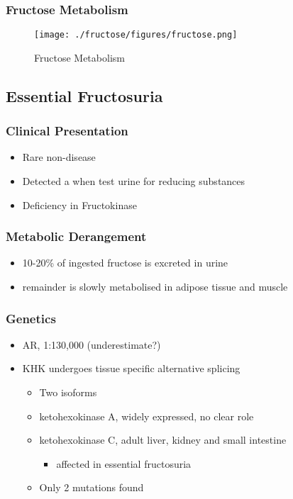 \documentclass{scrartcl}
\begin{document}
\subsubsection{Fructose Metabolism}
\label{sec:org4717860}
\begin{figure}[htbp]
\centering
\texttt{[image: ./fructose/figures/fructose.png]}
\caption[Fructose]{\label{fig:orgfacca5b}
Fructose Metabolism}
\end{figure}
\subsection{Essential Fructosuria}
\label{sec:orge437605}
\subsubsection{Clinical Presentation}
\label{sec:orge31ba7d}
\begin{itemize}
\item Rare non-disease
\item Detected a when test urine for reducing substances
\item Deficiency in Fructokinase
\end{itemize}
\subsubsection{Metabolic Derangement}
\label{sec:orgf5eeb87}
\begin{itemize}
\item 10-20\% of ingested fructose is excreted in urine
\item remainder is slowly metabolised in adipose tissue and muscle
\end{itemize}
\subsubsection{Genetics}
\label{sec:org37abae2}
\begin{itemize}
\item AR, 1:130,000 (underestimate?)
\item KHK undergoes tissue specific alternative splicing
\begin{itemize}
\item Two isoforms
\item ketohexokinase A, widely expressed, no clear role
\item ketohexokinase C, adult liver, kidney and small intestine
\begin{itemize}
\item affected in essential fructosuria
\end{itemize}
\item Only 2 mutations found
\end{itemize}
\end{itemize}
\end{document}
